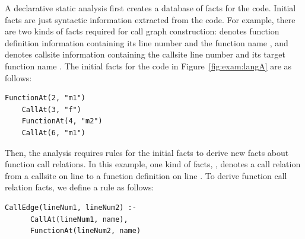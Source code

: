 A declarative static analysis first creates a database of facts for the
code. Initial facts are just syntactic information extracted from the code.
For example, there are two kinds of facts required for call graph
construction:  denotes function definition
information containing its line number  and the function name , and  denotes callsite information
containing the callsite line number  and its target function name . The initial facts for the code in Figure~\ref{fig:exam:langA} are as follows: 


\begin{lstlisting}[style=mrule]
    FunctionAt(2, "m1")
    CallAt(3, "f")
    FunctionAt(4, "m2")
    CallAt(6, "m1")
\end{lstlisting}

Then, the analysis requires rules for the initial facts to derive new facts
about function call relations. In this example, one kind of facts, , denotes a call relation from a callsite on line 
to a function definition on line . To derive function call relation facts,
we define a rule as follows: 


\begin{lstlisting}[style=mrule]
    CallEdge(lineNum1, lineNum2) :-
      CallAt(lineNum1, name),
      FunctionAt(lineNum2, name)
\end{lstlisting}

